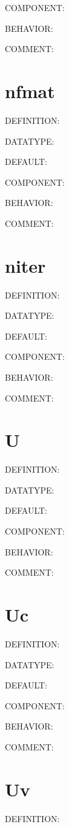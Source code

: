 {\color{brown}COMPONENT:}

{\color{purple}BEHAVIOR:}

{\color{olive}COMMENT:}

\section{nfmat}
{\color{red}DEFINITION:}

{\color{green}DATATYPE:}

{\color{blue}DEFAULT:}

{\color{brown}COMPONENT:}

{\color{purple}BEHAVIOR:}

{\color{olive}COMMENT:}

\section{niter}
{\color{red}DEFINITION:}

{\color{green}DATATYPE:}

{\color{blue}DEFAULT:}

{\color{brown}COMPONENT:}

{\color{purple}BEHAVIOR:}

{\color{olive}COMMENT:}

\section{U}
{\color{red}DEFINITION:}

{\color{green}DATATYPE:}

{\color{blue}DEFAULT:}

{\color{brown}COMPONENT:}

{\color{purple}BEHAVIOR:}

{\color{olive}COMMENT:}

\section{Uc}
{\color{red}DEFINITION:}

{\color{green}DATATYPE:}

{\color{blue}DEFAULT:}

{\color{brown}COMPONENT:}

{\color{purple}BEHAVIOR:}

{\color{olive}COMMENT:}

\section{Uv}
{\color{red}DEFINITION:}

